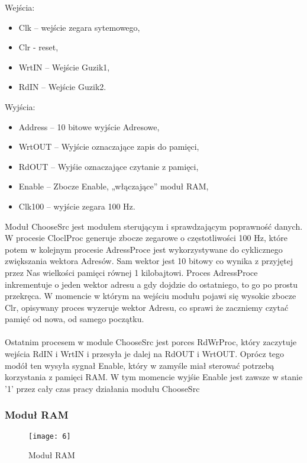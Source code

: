 \documentclass[11pt]{article}
\begin{document}
	Wejścia:
	\begin{itemize}[noitemsep]
	\item Clk – wejście zegara sytemowego,
	\item Clr - reset,
	\item WrtIN – Wejście Guzik1,
	\item RdIN – Wejście Guzik2.
	\end{itemize}
	Wyjścia:
	\begin{itemize}[noitemsep]
	\item Address – 10 bitowe wyjście Adresowe,
	\item WrtOUT – Wyjście oznaczające zapis do pamięci,
	\item RdOUT – Wyjśie oznaczające czytanie z pamięci,
	\item Enable – Zbocze Enable, „włączające” moduł RAM,
	\item Clk100 – wyjście zegara 100 Hz.
	\end{itemize}
	
	Moduł ChooseSrc jest modułem sterującym i sprawdzającym poprawność danych. W procesie CloclProc generuje zbocze zegarowe o częstotliwości 100 Hz, które potem w kolejnym procesie AdressProce jest wykorzystywane do cyklicznego zwiększania wektora Adresów. Sam wektor jest 10 bitowy co wynika z przyjętej przez Nas wielkości pamięci równej 1 kilobajtowi. Proces AdressProce inkrementuje o jeden wektor adresu a gdy dojdzie do ostatniego, to go po prostu przekręca. W momencie w którym na wejściu modułu pojawi się wysokie zbocze Clr, opisywany proces wyzeruje wektor Adresu, co sprawi że zaczniemy czytać pamięć od nowa, od samego początku. \\\\Ostatnim procesem w module ChooseSrc jest porces RdWrProc, który zaczytuje wejścia RdIN i WrtIN i przesyła je dalej na RdOUT i WrtOUT. Oprócz tego modół ten wysyła sygnał Enable, który w zamyśle miał sterować potrzebą korzystania z pamięci RAM. W tym momencie wyjśie Enable jest zawsze w stanie '1' przez cały czas pracy działania modułu ChooseSrc
	
	\subsubsection{Moduł RAM}

	\begin{figure}[H]
		\centering
		\texttt{[image: 6]}
		\caption{Moduł RAM}
		\label{fig:6}
	\end{figure}
	
\end{document}
